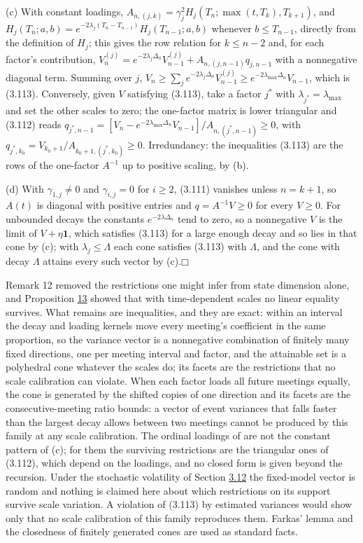 \documentclass[11pt]{article}
\providecommand{\square}{\mdlgwhtsquare}
\begin{document}
(c) With constant loadings, \(A_{n,(j,k)} = \gamma_j^2 H_j(T_n; \max(t, T_k), T_{k+1})\), and \(H_j(T_n; a, b) = e^{-2\lambda_j (T_n - T_{n-1})} H_j(T_{n-1}; a, b)\) whenever \(b \le T_{n-1}\), directly from the definition of \(H_j\); this gives the row relation for \(k \le n - 2\) and, for each factor's contribution, \(V^{(j)}_n = e^{-2\lambda_j \Delta_n} V^{(j)}_{n-1} + A_{n,(j,n-1)} q_{j,n-1}\) with a nonnegative diagonal term. Summing over \(j\), \(V_n \ge \sum_j e^{-2\lambda_j \Delta_n} V^{(j)}_{n-1} \ge e^{-2\lambda_{\max} \Delta_n} V_{n-1}\), which is (3.113). Conversely, given \(V\) satisfying (3.113), take a factor \(j^*\) with \(\lambda_{j^*} = \lambda_{\max}\) and set the other scales to zero; the one-factor matrix is lower triangular and (3.112) reads \(q_{j^*, n-1} = [V_n - e^{-2\lambda_{\max} \Delta_n} V_{n-1}] / A_{n,(j^*,n-1)} \ge 0\), with \(q_{j^*, k_0} = V_{k_0+1} / A_{k_0+1,(j^*,k_0)} \ge 0\). Irredundancy: the inequalities (3.113) are the rows of the one-factor \(A^{-1}\) up to positive scaling, by (b).

(d) With \(\gamma_{1,j} \ne 0\) and \(\gamma_{i,j} = 0\) for \(i \ge 2\), (3.111) vanishes unless \(n = k + 1\), so \(A(t)\) is diagonal with positive entries and \(q = A^{-1} V \ge 0\) for every \(V \ge 0\). For unbounded decays the constants \(e^{-2\lambda \Delta_n}\) tend to zero, so a nonnegative \(V\) is the limit of \(V + \eta \mathbf 1\), which satisfies (3.113) for a large enough decay and so lies in that cone by (c); with \(\lambda_j \le \Lambda\) each cone satisfies (3.113) with \(\Lambda\), and the cone with decay \(\Lambda\) attains every such vector by (c).\hfill$\square$

Remark 12 removed the restrictions one might infer from state dimension alone, and Proposition \hyperref[res:Proposition-13]{13} showed that with time-dependent scales no linear equality survives. What remains are inequalities, and they are exact: within an interval the decay and loading kernels move every meeting's coefficient in the same proportion, so the variance vector is a nonnegative combination of finitely many fixed directions, one per meeting interval and factor, and the attainable set is a polyhedral cone whatever the scales do; its facets are the restrictions that no scale calibration can violate. When each factor loads all future meetings equally, the cone is generated by the shifted copies of one direction and its facets are the consecutive-meeting ratio bounds: a vector of event variances that falls faster than the largest decay allows between two meetings cannot be produced by this family at any scale calibration. The ordinal loadings of \cite{brace2024sofr} are not the constant pattern of (c); for them the surviving restrictions are the triangular ones of (3.112), which depend on the loadings, and no closed form is given beyond the recursion. Under the stochastic volatility of Section \hyperref[sec:3.12]{3.12} the fixed-model vector is random and nothing is claimed here about which restrictions on its support survive scale variation. A violation of (3.113) by estimated variances would show only that no scale calibration of this family reproduces them. Farkas' lemma and the closedness of finitely generated cones are used as standard facts.
\end{document}
